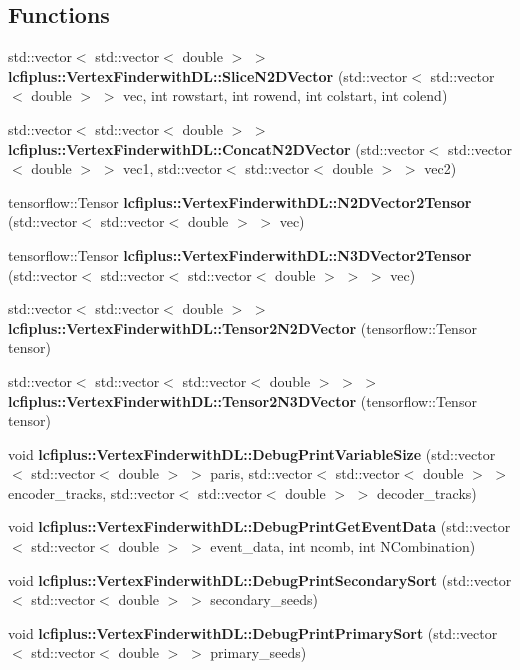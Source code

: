 \subsection*{Functions}
\begin{DoxyCompactItemize}
\item 
std\+::vector$<$ std\+::vector$<$ double $>$ $>$ \textbf{ lcfiplus\+::\+Vertex\+Finderwith\+D\+L\+::\+Slice\+N2\+D\+Vector} (std\+::vector$<$ std\+::vector$<$ double $>$ $>$ vec, int rowstart, int rowend, int colstart, int colend)
\item 
std\+::vector$<$ std\+::vector$<$ double $>$ $>$ \textbf{ lcfiplus\+::\+Vertex\+Finderwith\+D\+L\+::\+Concat\+N2\+D\+Vector} (std\+::vector$<$ std\+::vector$<$ double $>$ $>$ vec1, std\+::vector$<$ std\+::vector$<$ double $>$ $>$ vec2)
\item 
tensorflow\+::\+Tensor \textbf{ lcfiplus\+::\+Vertex\+Finderwith\+D\+L\+::\+N2\+D\+Vector2\+Tensor} (std\+::vector$<$ std\+::vector$<$ double $>$ $>$ vec)
\item 
tensorflow\+::\+Tensor \textbf{ lcfiplus\+::\+Vertex\+Finderwith\+D\+L\+::\+N3\+D\+Vector2\+Tensor} (std\+::vector$<$ std\+::vector$<$ std\+::vector$<$ double $>$ $>$ $>$ vec)
\item 
std\+::vector$<$ std\+::vector$<$ double $>$ $>$ \textbf{ lcfiplus\+::\+Vertex\+Finderwith\+D\+L\+::\+Tensor2\+N2\+D\+Vector} (tensorflow\+::\+Tensor tensor)
\item 
std\+::vector$<$ std\+::vector$<$ std\+::vector$<$ double $>$ $>$ $>$ \textbf{ lcfiplus\+::\+Vertex\+Finderwith\+D\+L\+::\+Tensor2\+N3\+D\+Vector} (tensorflow\+::\+Tensor tensor)
\item 
void \textbf{ lcfiplus\+::\+Vertex\+Finderwith\+D\+L\+::\+Debug\+Print\+Variable\+Size} (std\+::vector$<$ std\+::vector$<$ double $>$ $>$ paris, std\+::vector$<$ std\+::vector$<$ double $>$ $>$ encoder\+\_\+tracks, std\+::vector$<$ std\+::vector$<$ double $>$ $>$ decoder\+\_\+tracks)
\item 
void \textbf{ lcfiplus\+::\+Vertex\+Finderwith\+D\+L\+::\+Debug\+Print\+Get\+Event\+Data} (std\+::vector$<$ std\+::vector$<$ double $>$ $>$ event\+\_\+data, int ncomb, int N\+Combination)
\item 
void \textbf{ lcfiplus\+::\+Vertex\+Finderwith\+D\+L\+::\+Debug\+Print\+Secondary\+Sort} (std\+::vector$<$ std\+::vector$<$ double $>$ $>$ secondary\+\_\+seeds)
\item 
void \textbf{ lcfiplus\+::\+Vertex\+Finderwith\+D\+L\+::\+Debug\+Print\+Primary\+Sort} (std\+::vector$<$ std\+::vector$<$ double $>$ $>$ primary\+\_\+seeds)

\end{DoxyCompactItemize}
